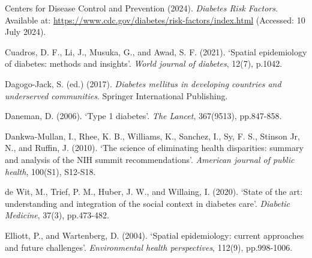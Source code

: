 \begin{Reference}
\begin{flushleft}
Centers for Disease Control and Prevention (2024). \textit{Diabetes Risk Factors}. Available at: \url{https://www.cdc.gov/diabetes/risk-factors/index.html} (Accessed: 10 July 2024).
\end{flushleft}
\vspace{2pt}


\begin{flushleft}
Cuadros, D. F., Li, J., Musuka, G., and Awad, S. F. (2021). `Spatial epidemiology of diabetes: methods and insights'. \textit{World journal of diabetes}, 12(7), p.1042.
\end{flushleft}
\vspace{2pt}


\begin{flushleft}
Dagogo-Jack, S. (ed.) (2017). \textit{Diabetes mellitus in developing countries and underserved communities}. Springer International Publishing.
\end{flushleft}
\vspace{2pt}


\begin{flushleft}
Daneman, D. (2006). `Type 1 diabetes'. \textit{The Lancet}, 367(9513), pp.847-858.
\end{flushleft}
\vspace{2pt}


\begin{flushleft}
Dankwa-Mullan, I., Rhee, K. B., Williams, K., Sanchez, I., Sy, F. S., Stinson Jr, N., and Ruffin, J. (2010). `The science of eliminating health disparities: summary and analysis of the NIH summit recommendations'. \textit{American journal of public health}, 100(S1), S12-S18.
\end{flushleft}
\vspace{2pt}


\begin{flushleft}
de Wit, M., Trief, P. M., Huber, J. W., and Willaing, I. (2020). `State of the art: understanding and integration of the social context in diabetes care'. \textit{Diabetic Medicine}, 37(3), pp.473-482.
\end{flushleft}
\vspace{2pt}


\begin{flushleft}
Elliott, P., and Wartenberg, D. (2004). `Spatial epidemiology: current approaches and future challenges'. \textit{Environmental health perspectives}, 112(9), pp.998-1006.
\end{flushleft}
\vspace{2pt}



\end{Reference}
